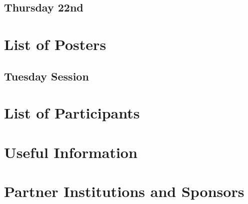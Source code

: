 \documentclass[openany, parskip=full, 12pt, a4]{scrbook}
\begin{document}
\section{Thursday 22nd}



\chapter{List of Posters} 

\vspace{-2.5em}

\section{Tuesday Session}











\chapter{List of Participants}
 

 
\chapter{Useful Information}



\chapter{Partner Institutions and Sponsors}



\newpage


\pagecolor{myblue}
\thispagestyle{empty}
\mbox{}
\end{document}
